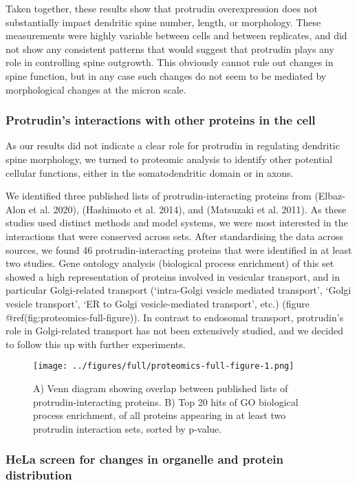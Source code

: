 \documentclass[
]{article}
\begin{document}
Taken together, these results show that protrudin overexpression does
not substantially impact dendritic spine number, length, or morphology.
These measurements were highly variable between cells and between
replicates, and did not show any consistent patterns that would suggest
that protrudin plays any role in controlling spine outgrowth. This
obviously cannot rule out changes in spine function, but in any case
such changes do not seem to be mediated by morphological changes at the
micron scale.

\hypertarget{GO-analysis}{%
\subsubsection{Protrudin's interactions with other proteins in the
cell}\label{GO-analysis}}

As our results did not indicate a clear role for protrudin in regulating
dendritic spine morphology, we turned to proteomic analysis to identify
other potential cellular functions, either in the somatodendritic domain
or in axons.

We identified three published lists of protrudin-interacting proteins
from (Elbaz-Alon et al. 2020), (Hashimoto et al. 2014), and (Matsuzaki
et al. 2011). As these studies used distinct methods and model systems,
we were most interested in the interactions that were conserved across
sets. After standardising the data across sources, we found 46
protrudin-interacting proteins that were identified in at least two
studies. Gene ontology analysis (biological process enrichment) of this
set showed a high representation of proteins involved in vesicular
transport, and in particular Golgi-related transport (`intra-Golgi
vesicle mediated transport', `Golgi vesicle transport', `ER to Golgi
vesicle-mediated transport', etc.) (figure
@ref(fig:proteomics-full-figure)). In contrast to endosomal transport,
protrudin's role in Golgi-related transport has not been extensively
studied, and we decided to follow this up with further experiments.

\begin{figure}
\centering
\texttt{[image: ../figures/full/proteomics-full-figure-1.png]}
\caption{A) Venn diagram showing overlap between published lists of
protrudin-interacting proteins. B) Top 20 hits of GO biological process
enrichment, of all proteins appearing in at least two protrudin
interaction sets, sorted by p-value.}
\end{figure}

\hypertarget{hela-screen-for-changes-in-organelle-and-protein-distribution}{%
\subsubsection{HeLa screen for changes in organelle and protein
distribution}\label{hela-screen-for-changes-in-organelle-and-protein-distribution}}
\end{document}
